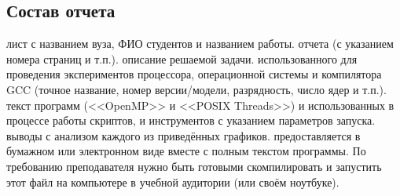 \subsection{Состав отчета}

\begin{enumerate}
     лист с названием вуза, ФИО студентов и названием работы. 
     отчета (с указанием номера страниц и т.п.).
     описание решаемой задачи.
     использованного для проведения экспериментов процессора, операционной системы и компилятора GCC (точное название, номер версии/модели, разрядность, число ядер и т.п.).
     текст программ (<<OpenMP>> и <<POSIX Threads>>) и использованных в процессе работы скриптов, и инструментов с указанием параметров запуска.
     выводы с анализом каждого из приведённых графиков.
     предоставляется в бумажном или электронном виде вместе с полным текстом программы. По требованию преподавателя нужно быть готовыми скомпилировать и запустить этот файл на компьютере в учебной аудитории (или своём ноутбуке).
\end{enumerate}